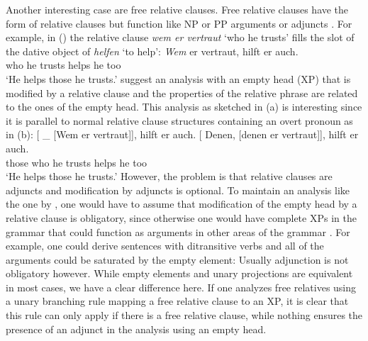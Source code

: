 \documentclass[output=paper
  ,nobabel
  ,draftmode
  ,uniformtopskip %
  ,colorlinks, citecolor=brown
]{langscibook}
\begin{document}
Another interesting case are free relative clauses. Free relative clauses have the form of relative
clauses but function like NP or PP arguments or adjuncts \citep{Bausewein90,Mueller99b}. For
example, in () the relative clause \emph{wem er vertraut} `who he trusts' fills the slot of the dative object of \emph{helfen} `to help':
\ea
\gll \emph{Wem}  er vertraut, hilft er auch.\footnotemark\\
     who he trusts    helps he too\\
\glt `He helps those he trusts.'
\z
%
\citet[Section~2]{GR81a} suggest an analysis with an empty head (XP) that is modified by a relative
clause and the properties of the relative phrase are related to the ones of the empty head. This
analysis as sketched in (a) is interesting since it is parallel to normal relative clause structures containing an
overt pronoun as in (b):
\eal
\ex {}[\sub{\npdat} \_\sub{\npdat} [Wem er vertraut]], hilft er auch.
\ex 
\gll {}[\sub{\npdat} Denen, [denen er vertraut]], hilft er auch.\\
     {}              those              \spacebr{}who   he trusts    helps he too\\
\glt `He helps those he trusts.'
\zl
However, the problem is that relative clauses are adjuncts and modification by adjuncts is
optional. To maintain an analysis like the one by \citeauthor{GR81a}, one would have to assume that
modification of the empty head by a relative clause is obligatory, since otherwise one would have
complete XPs in the grammar that could function as arguments in other areas of the grammar
\citep[]{Mueller99b}. For example, one could derive sentences with ditransitive verbs and
all of the arguments could be saturated by the empty element:
\z
Usually adjunction is not obligatory however. While empty elements and unary projections are
equivalent in most cases, we have a clear difference here. If one analyzes free relatives using a
unary branching rule mapping a free relative clause to an XP, it is clear that this rule can only
apply if there is a free relative clause, while nothing ensures the presence of an adjunct in the
analysis using an empty head.
\end{document}
